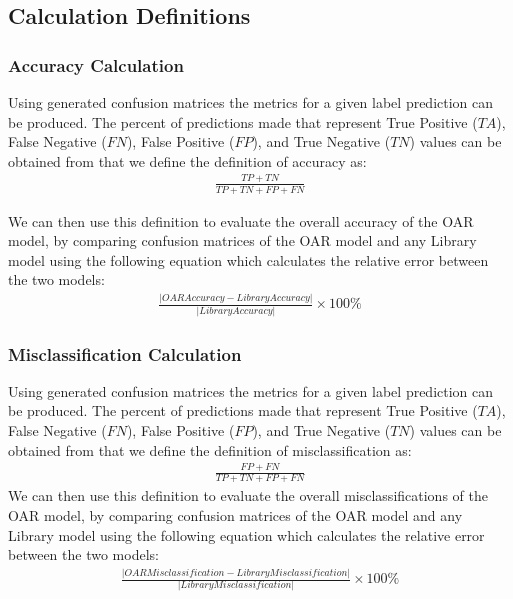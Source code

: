 \documentclass[12pt, titlepage]{article}
\begin{document}
\subsection{Calculation Definitions}

\subsubsection{Accuracy Calculation} \label{accuracy_calc}

Using generated confusion matrices the metrics for a given label prediction can be produced. The percent of predictions made
that represent True Positive ($\mathit{TA}$), False Negative ($\mathit{FN}$), False Positive ($\mathit{FP}$), and True Negative ($\mathit{TN}$) values can be obtained 
from that we define the definition of accuracy as:
\begin{gather}
\frac{\mathit{TP} + \mathit{TN}}{\mathit{TP} + \mathit{TN} + \mathit{FP} + \mathit{FN}}
\end{gather}

We can then use this definition to evaluate the overall accuracy of the OAR model, by comparing confusion matrices of the OAR model 
and any Library model using the following equation which calculates the relative error between the two models:
\begin{gather}
\frac{|\mathit{OAR Accuracy} - \mathit{Library Accuracy}|}{|\mathit{Library Accuracy}|} \times 100\% 
\end{gather}
\subsubsection{Misclassification Calculation} \label{misclass_calc}

Using generated confusion matrices the metrics for a given label prediction can be produced. The percent of predictions made
that represent True Positive ($\mathit{TA}$), False Negative ($\mathit{FN}$), False Positive ($\mathit{FP}$), and True Negative ($\mathit{TN}$) values can be obtained 
from that we define the definition of misclassification as:
\begin{gather}
\frac{\mathit{FP} + \mathit{FN}}{\mathit{TP} + \mathit{TN} + \mathit{FP} + \mathit{FN}}
\end{gather}
We can then use this definition to evaluate the overall misclassifications of the OAR model, by comparing confusion matrices of the OAR model 
and any Library model using the following equation which calculates the relative error between the two models:
\begin{gather}
\frac{|\mathit{OAR Misclassification} - \mathit{Library Misclassification}|}{|\mathit{Library Misclassification}|} \times 100\% 
\end{gather}
\end{document}
